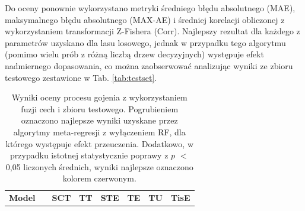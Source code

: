 Do oceny ponownie wykorzystano metryki średniego błędu absolutnego (MAE), maksymalnego błędu absolutnego (MAX-AE) i średniej korelacji obliczonej z wykorzystaniem transformacji Z-Fishera (Corr). Najlepszy rezultat dla każdego z parametrów uzyskano dla lasu losowego, jednak w przypadku tego algorytmu (pomimo wielu prób z różną liczbą drzew decyzyjnych) występuje efekt nadmiernego dopasowania, co można zaobserwować analizując wyniki ze zbioru testowego zestawione \linebreak w Tab. \ref{tab:testset}. 

\begin{table}[]
	\caption{Wyniki oceny procesu gojenia z wykorzystaniem fuzji cech i zbioru testowego. Pogrubieniem oznaczono najlepsze wyniki uzyskane przez algorytmy meta-regresji z wyłączeniem RF, dla którego występuje efekt przeuczenia. Dodatkowo, w przypadku istotnej statystycznie poprawy z $p$ $<$ 0,05 liczonych średnich, wyniki najlepsze oznaczono kolorem czerwonym.}
	\scriptsize
	\begin{center}
		\begin{tabular}{lc||c|c|c|c|c|c}
			\textbf{Model} & & \textbf{SCT} & \textbf{TT} & \textbf{STE} & \textbf{TE} & \textbf{TU} & \textbf{TisE}\\ 
			

\end{tabular}
\end{center}
\end{table}
